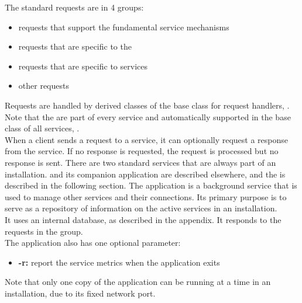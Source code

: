 The standard requests are in 4 groups:
\begin{itemize}
\item \textbf{} requests that support the
fundamental \mplusm{} service mechanisms
\item \textbf{} requests
that are specific to the 
\item \textbf{} requests that
are specific to  services
\item \textbf{} other
requests
\end{itemize}
Requests are handled by derived classes of the base class for request handlers,
.
Note that the  are part of every service and
automatically supported in the base class of all services,
.\\

When a client sends a request to a service, it can optionally request a response from the
service.
If no response is requested, the request is processed but no response is sent.
There are two standard services that are always part of an \mplusm{} installation.
 and its companion application
 are described elsewhere, and the
 is described in the following section.
The  application is a background service
that is used to manage other services and their connections.
Its primary purpose is to serve as a repository of information on the active services in
an \mplusm{} installation.\\

It uses an internal database, as described in the
 appendix.
It responds to the requests in the
 group.\\

The application also has one optional parameter:
\begin{itemize}
\item \textbf{-r:} report the service metrics when the application exits
\end{itemize}
Note that only one copy of the 
application can be running at a time in an \mplusm{} installation, due to its fixed
\yarp{} network port.\\

